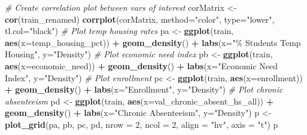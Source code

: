 \documentclass[
  man,floatsintext]{apa6}
\newenvironment{Shaded}{\begin{snugshade}}{\end{snugshade}}
\newcommand{\AttributeTok}[1]{\textcolor[rgb]{0.13,0.29,0.53}{#1}}
\newcommand{\CommentTok}[1]{\textcolor[rgb]{0.56,0.35,0.01}{\textit{#1}}}
\newcommand{\DecValTok}[1]{\textcolor[rgb]{0.00,0.00,0.81}{#1}}
\newcommand{\FunctionTok}[1]{\textcolor[rgb]{0.13,0.29,0.53}{\textbf{#1}}}
\newcommand{\NormalTok}[1]{#1}
\newcommand{\OtherTok}[1]{\textcolor[rgb]{0.56,0.35,0.01}{#1}}
\newcommand{\SpecialCharTok}[1]{\textcolor[rgb]{0.81,0.36,0.00}{\textbf{#1}}}
\newcommand{\StringTok}[1]{\textcolor[rgb]{0.31,0.60,0.02}{#1}}
\begin{document}
\begin{Shaded}
\begin{Highlighting}[]
\CommentTok{\# Create correlation plot between vars of interest}
\NormalTok{corMatrix }\OtherTok{\textless{}{-}} \FunctionTok{cor}\NormalTok{(train\_renamed)}
\FunctionTok{corrplot}\NormalTok{(corMatrix, }\AttributeTok{method=}\StringTok{"color"}\NormalTok{, }\AttributeTok{type=}\StringTok{"lower"}\NormalTok{, }\AttributeTok{tl.col=}\StringTok{"black"}\NormalTok{)}
\CommentTok{\# Plot temp housing rates}
\NormalTok{pa }\OtherTok{\textless{}{-}} \FunctionTok{ggplot}\NormalTok{(train, }\FunctionTok{aes}\NormalTok{(}\AttributeTok{x=}\NormalTok{temp\_housing\_pct)) }\SpecialCharTok{+}
    \FunctionTok{geom\_density}\NormalTok{() }\SpecialCharTok{+}
    \FunctionTok{labs}\NormalTok{(}\AttributeTok{x=}\StringTok{"\% Students Temp Housing"}\NormalTok{, }\AttributeTok{y=}\StringTok{"Density"}\NormalTok{)}
\CommentTok{\# Plot economic need index}
\NormalTok{pb }\OtherTok{\textless{}{-}} \FunctionTok{ggplot}\NormalTok{(train, }\FunctionTok{aes}\NormalTok{(}\AttributeTok{x=}\NormalTok{economic\_need)) }\SpecialCharTok{+}
    \FunctionTok{geom\_density}\NormalTok{() }\SpecialCharTok{+}
    \FunctionTok{labs}\NormalTok{(}\AttributeTok{x=}\StringTok{"Economic Need Index"}\NormalTok{, }\AttributeTok{y=}\StringTok{"Density"}\NormalTok{)}
\CommentTok{\# Plot enrollment}
\NormalTok{pc }\OtherTok{\textless{}{-}} \FunctionTok{ggplot}\NormalTok{(train, }\FunctionTok{aes}\NormalTok{(}\AttributeTok{x=}\NormalTok{enrollment)) }\SpecialCharTok{+}
    \FunctionTok{geom\_density}\NormalTok{() }\SpecialCharTok{+}
    \FunctionTok{labs}\NormalTok{(}\AttributeTok{x=}\StringTok{"Enrollment"}\NormalTok{, }\AttributeTok{y=}\StringTok{"Density"}\NormalTok{)}
\CommentTok{\# Plot chronic absenteeism}
\NormalTok{pd }\OtherTok{\textless{}{-}} \FunctionTok{ggplot}\NormalTok{(train, }\FunctionTok{aes}\NormalTok{(}\AttributeTok{x=}\NormalTok{val\_chronic\_absent\_hs\_all)) }\SpecialCharTok{+}
    \FunctionTok{geom\_density}\NormalTok{() }\SpecialCharTok{+}
    \FunctionTok{labs}\NormalTok{(}\AttributeTok{x=}\StringTok{"Chronic Absenteeism"}\NormalTok{, }\AttributeTok{y=}\StringTok{"Density"}\NormalTok{)}
\NormalTok{p }\OtherTok{\textless{}{-}} \FunctionTok{plot\_grid}\NormalTok{(pa, pb, pc, pd, }\AttributeTok{nrow =} \DecValTok{2}\NormalTok{, }\AttributeTok{ncol =} \DecValTok{2}\NormalTok{, }\AttributeTok{align =} \StringTok{"hv"}\NormalTok{, }\AttributeTok{axis =} \StringTok{"t"}\NormalTok{)}
\NormalTok{p}


\end{Highlighting}
\end{Shaded}
\end{document}
